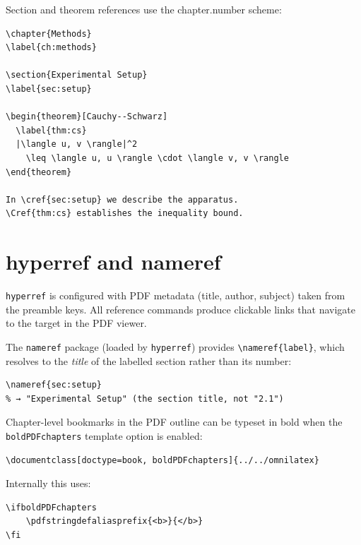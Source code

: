 Section and theorem references use the chapter.number scheme:

\begin{verbatim}
\chapter{Methods}
\label{ch:methods}

\section{Experimental Setup}
\label{sec:setup}

\begin{theorem}[Cauchy--Schwarz]
  \label{thm:cs}
  |\langle u, v \rangle|^2
    \leq \langle u, u \rangle \cdot \langle v, v \rangle
\end{theorem}

In \cref{sec:setup} we describe the apparatus.
\Cref{thm:cs} establishes the inequality bound.
\end{verbatim}

\section{hyperref and nameref}

\texttt{hyperref} is configured with PDF metadata (title, author, subject)
taken from the preamble keys.  All reference commands produce clickable
links that navigate to the target in the PDF viewer.

The \texttt{nameref} package (loaded by \texttt{hyperref}) provides
\verb|\nameref{label}|, which resolves to the \emph{title} of the
labelled section rather than its number:

\begin{verbatim}
\nameref{sec:setup}
% → "Experimental Setup" (the section title, not "2.1")
\end{verbatim}

Chapter-level bookmarks in the PDF outline can be typeset in bold when
the \texttt{boldPDFchapters} template option is enabled:

\begin{verbatim}
\documentclass[doctype=book, boldPDFchapters]{../../omnilatex}
\end{verbatim}

Internally this uses:

\begin{verbatim}
\ifboldPDFchapters
    \pdfstringdefaliasprefix{<b>}{</b>}
\fi
\end{verbatim}

